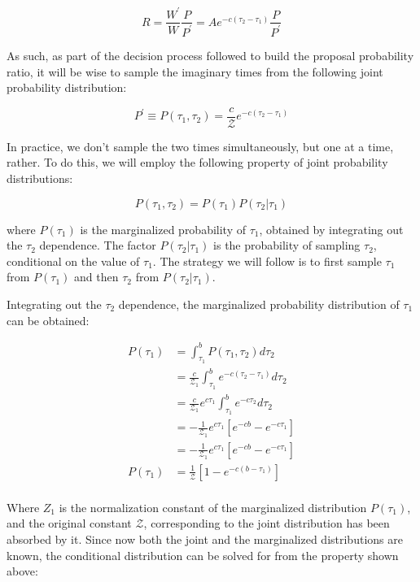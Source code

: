 \documentclass[12pt, two sided]{article}
\begin{document}
\begin{equation}
R =  \frac{W^\prime}{W} \frac{P}{P^\prime} = A e^{-c(\tau_2-\tau_1)} \frac{P}{P^\prime}
\end{equation}

As such, as part of the decision process followed to build the proposal probability ratio, it will be wise to sample the imaginary times from the following joint probability distribution:

\begin{equation}
P^\prime \equiv P(\tau_1,\tau_2) = \frac{c}{\mathcal{Z}} e^{-c(\tau_2-\tau_1)}
\end{equation}

In practice, we don't sample the two times simultaneously, but one at a time, rather. To do this, we will employ the following property of joint probability distributions:

\begin{equation}
P(\tau_1,\tau_2) = P(\tau_1) P(\tau_2 \vert \tau_1)
\end{equation}

where $P(\tau_1)$ is the marginalized probability of $\tau_1$, obtained by integrating out the $\tau_2$ dependence. The factor $P(\tau_2 \vert \tau_1)$ is the probability of sampling $\tau_2$, conditional on the value of $\tau_1$. The strategy we will follow is to first sample $\tau_1$ from $P(\tau_1)$ and then $\tau_2$ from $P(\tau_2 \vert \tau_1)$.

Integrating out the $\tau_2$ dependence, the marginalized probability distribution of $\tau_1$ can be obtained:

\begin{align}
P(\tau_1) &= \int_{\tau_1}^{b} P(\tau_1,\tau_2) d\tau_2 \\
&= \frac{c}{\mathcal{Z_1}} \int_{\tau_1}^{b} e^{-c(\tau_2-\tau_1)} d\tau_2 \\
&= \frac{c}{\mathcal{Z_1}} e^{c\tau_1} \int_{\tau_1}^{b} e^{-c\tau_2} d\tau_2 \\
&= -\frac{1}{\mathcal{Z_1}} e^{c\tau_1} [e^{-cb}-e^{-c\tau_1}] \\
&= -\frac{1}{\mathcal{Z_1}} e^{c\tau_1} [e^{-cb}-e^{-c\tau_1}] \\
P(\tau_1) &= \frac{1}{\mathcal{Z}}  [1-e^{-c(b-\tau_1)}] \\
\end{align}

Where $Z_1$ is the normalization constant of the marginalized distribution $P(\tau_1)$, and the original constant $\mathcal{Z}$, corresponding to the joint distribution has been absorbed by it. Since now both the joint and the marginalized distributions are known, the conditional distribution can be solved for from the property shown above:
\end{document}
